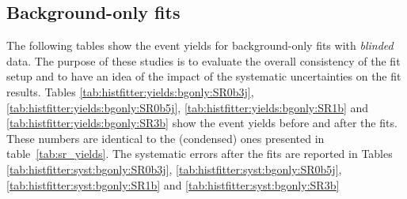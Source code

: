 \subsection{Background-only fits}

The following tables show the event yields for background-only fits with \textit{blinded} data. The purpose of these studies is to evaluate the overall consistency of
the fit setup and to have an idea of the impact of the systematic uncertainties on the fit results. Tables \ref{tab:histfitter:yields:bgonly:SR0b3j},
\ref{tab:histfitter:yields:bgonly:SR0b5j}, \ref{tab:histfitter:yields:bgonly:SR1b} and \ref{tab:histfitter:yields:bgonly:SR3b} show the event yields before and after the fits. 
These numbers are identical to the (condensed) ones presented in table~\ref{tab:sr_yields}. 
The systematic errors after the fits are reported in Tables \ref{tab:histfitter:syst:bgonly:SR0b3j}, \ref{tab:histfitter:syst:bgonly:SR0b5j}, \ref{tab:histfitter:syst:bgonly:SR1b}
and \ref{tab:histfitter:syst:bgonly:SR3b}

